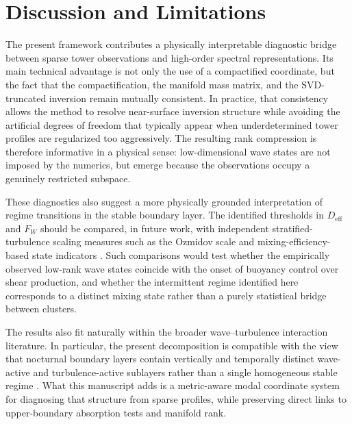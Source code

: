 \documentclass[11pt,a4paper]{article}
\begin{document}
\section{Discussion and Limitations}
\label{sec:discussion}

The present framework contributes a physically interpretable diagnostic bridge between sparse tower observations and high-order spectral representations. Its main technical advantage is not only the use of a compactified coordinate, but the fact that the compactification, the manifold mass matrix, and the SVD-truncated inversion remain mutually consistent. In practice, that consistency allows the method to resolve near-surface inversion structure while avoiding the artificial degrees of freedom that typically appear when underdetermined tower profiles are regularized too aggressively. The resulting rank compression is therefore informative in a physical sense: low-dimensional wave states are not imposed by the numerics, but emerge because the observations occupy a genuinely restricted subspace.

These diagnostics also suggest a more physically grounded interpretation of regime transitions in the stable boundary layer. The identified thresholds in $D_{\mathrm{eff}}$ and $F_W$ should be compared, in future work, with independent stratified-turbulence scaling measures such as the Ozmidov scale and mixing-efficiency-based state indicators \citep{Li2016, Garanaik2019}. Such comparisons would test whether the empirically observed low-rank wave states coincide with the onset of buoyancy control over shear production, and whether the intermittent regime identified here corresponds to a distinct mixing state rather than a purely statistical bridge between clusters.

The results also fit naturally within the broader wave--turbulence interaction literature. In particular, the present decomposition is compatible with the view that nocturnal boundary layers contain vertically and temporally distinct wave-active and turbulence-active sublayers rather than a single homogeneous stable regime \citep{Sun2015, Barbano2022}. What this manuscript adds is a metric-aware modal coordinate system for diagnosing that structure from sparse profiles, while preserving direct links to upper-boundary absorption tests and manifold rank.
\end{document}
